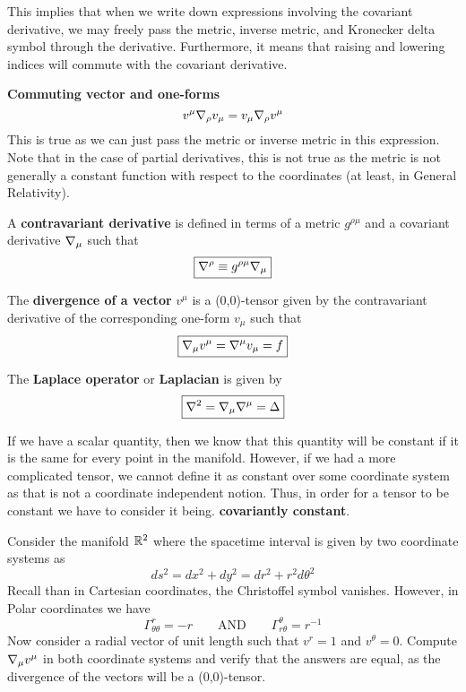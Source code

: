 \documentclass{article}
\begin{document}
 			This implies that when we write down expressions involving the covariant derivative, we may freely pass the metric, inverse metric, and Kronecker delta symbol through the derivative. Furthermore, it means that raising and lowering indices will commute with the covariant derivative. 
 			\begin{exmp}
 			 	\textbf{Commuting vector and one-forms}
 			 	$$ v^\mu \nabla_\rho v_\mu = v_\mu \nabla_\rho v^\mu$$
 			 	This is true as we can just pass the metric or inverse metric in this expression. Note that in the case of partial derivatives, this is not true as the metric is not generally a constant function with respect to the coordinates (at least, in General Relativity).
 			\end{exmp}
 			\begin{defn}
 				A \textbf{contravariant derivative} is defined in terms of a metric $g^{\rho\mu}$ and a covariant derivative $\nabla_\mu$ such that
 				\begin{equation}
 					\label{eq:ContravariantDerivative}
 					\boxed{\nabla^\rho \equiv g^{\rho\mu} \nabla_\mu}
 				\end{equation}
 			\end{defn}
 			\begin{defn}
 				The \textbf{divergence of a vector} $v^\mu$ is a (0,0)-tensor given by the contravariant derivative of the corresponding one-form $v_\mu$ such that
 				\begin{equation}
 					\label{eq:VectorDivergence}
 					\boxed{\nabla_\mu v^\mu = \nabla^\mu v_\mu = f}
 				\end{equation}
 			\end{defn}
 			\begin{defn}
 				The \textbf{Laplace operator} or \textbf{Laplacian} is given by
 				\begin{equation}
 					\label{eq:Laplacian}
 					\boxed{\nabla^2 = \nabla_\mu \nabla^\mu = \Delta }
 				\end{equation} 
 			\end{defn}
 			If we have a scalar quantity, then we know that this quantity will be constant if it is the same for every point in the manifold. However, if we had a more complicated tensor, we cannot define it as constant over some coordinate system as that is not a coordinate independent notion. Thus, in order for a tensor to be constant we have to consider it being. \textbf{covariantly constant}.
 			\begin{exe}
 				Consider the manifold $\mathbb{R}^2$ where the spacetime interval is given by two coordinate systems as
 				$$ ds^2 = dx^2 + dy^2 = dr^2 +r^2 d\theta^2$$
 				Recall than in Cartesian coordinates, the Christoffel symbol vanishes. However, in Polar coordinates we have
 				$$ \Gamma_{\theta\theta}^r = -r \quad\quad \text{AND} \quad\quad \Gamma_{r\theta}^\theta = r^{-1}$$
 				Now consider a radial vector of unit length such that $v^r = 1$ and $v^\theta = 0$. Compute $\nabla_\mu v^\mu$ in both coordinate systems and verify that the answers are equal, as the divergence of the vectors will be a (0,0)-tensor.
 			\end{exe}
\end{document}

